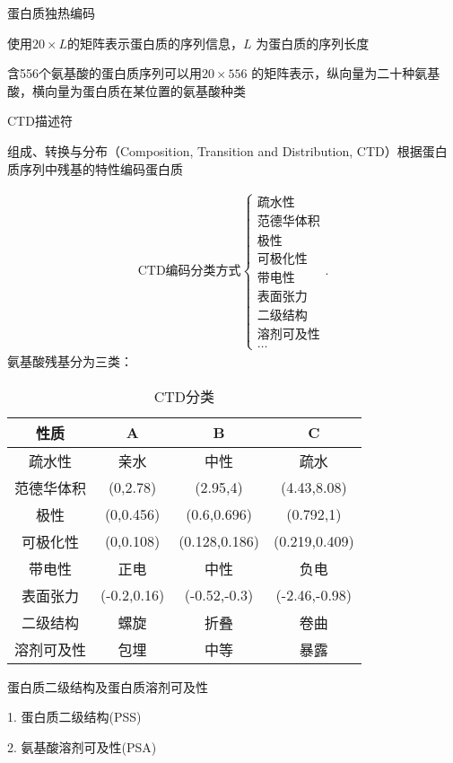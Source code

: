\begin{notation}
    蛋白质独热编码

    使用$20\times L$的矩阵表示蛋白质的序列信息，$L$ 为蛋白质的序列长度

    \begin{eg}
        含556个氨基酸的蛋白质序列可以用$20\times 556$ 的矩阵表示，纵向量为二十种氨基酸，横向量为蛋白质在某位置的氨基酸种类
    \end{eg}
\end{notation}
\begin{notation}
    CTD描述符

    组成、转换与分布（Composition, Transition and Distribution, CTD）根据蛋白质序列中残基的特性编码蛋白质
\end{notation}
\begin{align*}
    \text{CTD编码分类方式}
    \begin{cases}
        \text{疏水性}\\
        \text{范德华体积}\\
        \text{极性}\\
        \text{可极化性}\\
        \text{带电性}\\
        \text{表面张力}\\
        \text{二级结构}\\
        \text{溶剂可及性}\\
        \ldots
    \end{cases}
.\end{align*}
氨基酸残基分为三类：
\begin{table}[htpb]
    \centering
    \caption{CTD分类}
    \label{tab:CTD分类}
    \begin{tabular}{|c|c|c|c|}
    \hline
    性质 & A & B & C \\
    \hline
    疏水性 & 亲水 & 中性 & 疏水\\
    范德华体积 & (0,2.78) & (2.95,4) & (4.43,8.08) \\
    极性 & (0,0.456) & (0.6,0.696) & (0.792,1) \\
    可极化性 &  (0,0.108) & (0.128,0.186) & (0.219,0.409) \\
    带电性 & 正电 & 中性 & 负电 \\
    表面张力 & (-0.2,0.16) & (-0.52,-0.3) & (-2.46,-0.98) \\
    二级结构 & 螺旋 & 折叠 & 卷曲\\
    溶剂可及性 & 包埋 & 中等 & 暴露\\
    \hline
    \end{tabular}
\end{table}
\begin{notation}
    蛋白质二级结构及蛋白质溶剂可及性

    1. 蛋白质二级结构(PSS)

    2. 氨基酸溶剂可及性(PSA)
\end{notation}
